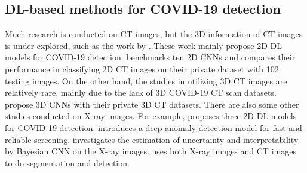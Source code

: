 \documentclass[letterpaper]{article}
\begin{document}




\subsection{DL-based methods for COVID-19 detection}
Much research is conducted on CT images, but the 3D information of CT images is under-explored, such as the work by \cite{He2020,Mobiny2020,Singh2020}. These work mainly propose 2D DL models for COVID-19 detection. \cite{Ardakani2020} benchmarks ten 2D CNNs and compares their performance in classifying 2D CT images on their private dataset with 102 testing images. On the other hand, the studies in utilizing 3D CT images are relatively rare, mainly due to the lack of 3D COVID-19 CT scan datasets. \cite{li2020artificial,Zheng2020} propose 3D CNNs with their private 3D CT datasets. There are also some other studies conducted on X-ray images. For example, \cite{Narin2020} proposes three 2D DL models for COVID-19 detection. \cite{Zhang2020} introduces a deep anomaly detection model for fast and reliable screening. \cite{Ghoshal2020} investigates the estimation of uncertainty and interpretability by Bayesian CNN on the X-ray images. \cite{Alom} uses both X-ray images and CT images to do segmentation and detection.
\end{document}
